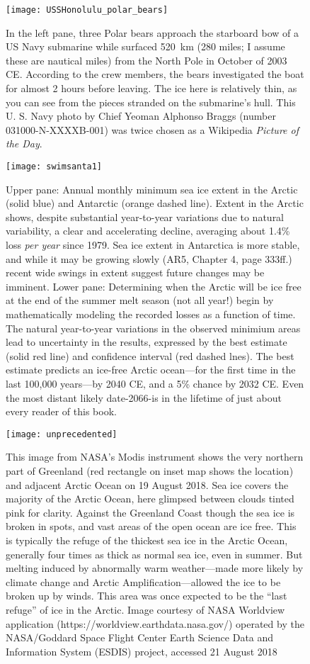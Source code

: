 \documentclass[amstex,12pt]{book}
\begin{document}
\begin{figure}[p]
	\centering
  \texttt{[image: USSHonolulu\_polar\_bears]}%
	\caption{In the left pane, three Polar bears approach the starboard bow of a US Navy submarine while surfaced \SI{520}{\kilo\metre} (280 miles; I assume these are nautical miles) from the North Pole in October of 2003 CE. According to the crew members, the bears investigated the boat for almost 2 hours before leaving. The ice here is relatively thin, as you can see from the pieces stranded on the submarine's hull. This U. S. Navy photo by Chief Yeoman Alphonso Braggs (number 031000-N-XXXXB-001) was twice chosen as a Wikipedia \textit{Picture of the Day}.}
	\label{fig:sub_polar}
\end{figure}


\begin{figure}[p]
	\centering
  \texttt{[image: swimsanta1]}%
	\caption{Upper pane: Annual monthly minimum sea ice extent in the Arctic (solid blue) and Antarctic (orange dashed line). Extent in the Arctic shows, despite substantial year-to-year variations due to natural variability, a clear and accelerating decline, averaging about 1.4\% loss \emph{per year} since 1979. Sea ice extent in Antarctica is more stable, and while it may be growing slowly (AR5, Chapter 4, page 333ff.) recent wide swings in extent suggest future changes may be imminent. Lower pane: Determining when the Arctic will be ice free at the end of the summer melt season (not all year!) begin by mathematically modeling the recorded losses as a function of time. The natural year-to-year variations in the observed minimium areas lead to uncertainty in the results, expressed by the best estimate (solid red line) and confidence interval (red dashed lnes). The best estimate predicts an ice-free Arctic ocean---for the first time in the last 100,000 years---by 2040 CE, and a 5\% chance by 2032 CE. Even the most distant likely date-2066-is in the lifetime of just about every reader of this book.    }
	\label{fig:min_ice}
\end{figure}

\begin{figure}[p]
	\centering
  \texttt{[image: unprecedented]}%
	\caption{This image from NASA's Modis instrument shows the very northern part of Greenland (red rectangle on inset map shows the location) and adjacent Arctic Ocean on 19 August 2018. Sea ice covers the majority of the Arctic Ocean, here glimpsed between clouds tinted pink for clarity. Against the Greenland Coast though the sea ice is broken in spots, and vast areas of the open ocean are ice free. This is typically the refuge of the thickest sea ice in the Arctic Ocean, generally four times as thick as normal sea ice, even in summer. But melting induced by abnormally warm weather---made more likely by climate change and Arctic Amplification---allowed the ice to be broken up by winds. This area was once expected to be the ``last refuge'' of ice in the Arctic. Image courtesy of NASA Worldview application (https://worldview.earthdata.nasa.gov/) operated by the NASA/Goddard Space Flight Center Earth Science Data and Information System (ESDIS) project, accessed 21 August 2018}
	\label{fig:breakup}
\end{figure}
\end{document}
